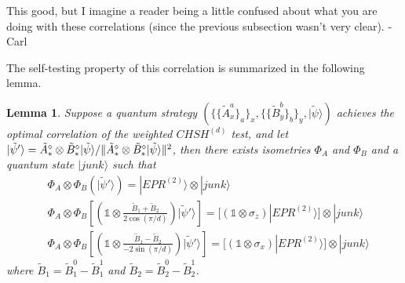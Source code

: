 \documentclass[11pt,letterpaper]{article}
\newcommand{\ket}[1]{|#1\rangle}
\newcommand{\x}{\otimes}
\DeclarePairedDelimiter{\norm}{\lVert}{\rVert}
\newcommand{\1}{\mathbb{1}}
\newcommand{\CHSH}{CHSH^{(d)}}
\newcommand{\EPR}[1]{EPR^{(#1)}}
\newcommand{\paulix}{\sigma_x}
\newcommand{\pauliz}{\sigma_z}
\newcommand{\tA}{\tilde{A}}
\newcommand{\tB}{\tilde{B}}
\newcommand{\tpsi}{\tilde{\psi}}
\def\carl#1{{\color{blue} #1 -Carl}}
\newtheorem{lemma}[theorem]{Lemma}
\theoremstyle{definition}
\begin{document}
\carl{This good, but I imagine a reader being a little confused about what you are doing
with these correlations (since the previous subsection wasn't very clear).}

The self-testing property of this correlation is summarized in the following lemma.
\begin{lemma}
	\label{lm:chsh_comp}
	Suppose a quantum strategy $\left(\{\{\tA_x^a\}_a\}_x, \{\{\tB_y^b\}_b\}_y, \ket{\tpsi}\right)$
	achieves the optimal correlation of the weighted $\CHSH$ test, 
	and let $\ket{\tpsi'} = \tA_\ast^\diamond \x \tB_\ast^\diamond \ket{\tpsi}/\norm{\tA_\ast^\diamond \x \tB_\ast^\diamond \ket{\tpsi}}^2$,
	then there exists isometries $\Phi_A$ and $\Phi_B$ 
	and a quantum state $\ket{junk}$
	such that 
	\begin{align*}
		&\Phi_A\x \Phi_B \left( \ket{\tpsi'}\right) = \ket{\EPR{2}}\x \ket{junk} \\
		&\Phi_A\x \Phi_B \left[\left(\1 \x  \frac{\tB_1 + \tB_2}{2\cos(\pi/d)}\right)\ket{\tpsi'}\right]
		=[(\1 \x \pauliz) \ket{\EPR{2}}] \x \ket{junk} \\
		&\Phi_A\x \Phi_B \left[\left(\1 \x  \frac{\tB_1 - \tB_2}{-2\sin(\pi/d)}\right)\ket{\tpsi'} \right]
		=[(\1 \x \paulix) \ket{\EPR{2}}] \x \ket{junk} 
	\end{align*}
	where $\tB_1 = \tB_1^0 - \tB_1^1$ and $\tB_2 = \tB_2^0 - \tB_2^1$.
\end{lemma}
\end{document}
